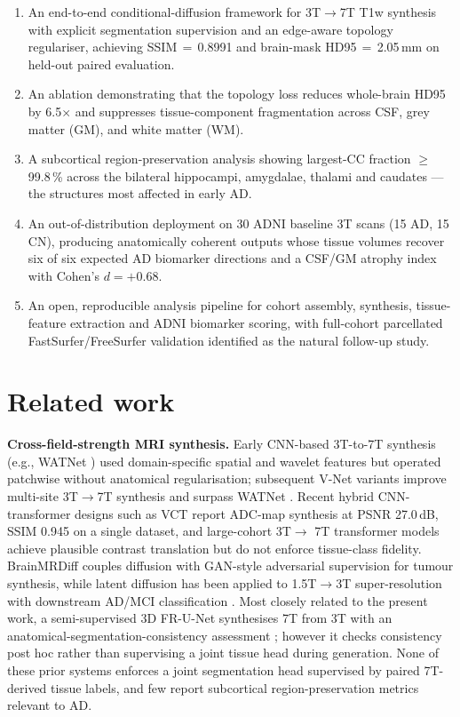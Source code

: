 \documentclass[10pt,twocolumn,a4paper]{article}
\begin{document}
\begin{enumerate}\itemsep1pt
\item An end-to-end conditional-diffusion framework for 3T$\rightarrow$7T
T1w synthesis with explicit segmentation supervision and an edge-aware
topology regulariser, achieving SSIM\,$=$\,0.8991 and brain-mask
HD95\,$=$\,2.05\,mm on held-out paired evaluation.
\item An ablation demonstrating that the topology loss reduces
whole-brain HD95 by 6.5$\times$ and suppresses tissue-component
fragmentation across CSF, grey matter (GM), and white matter (WM).
\item A subcortical region-preservation analysis showing largest-CC
fraction $\geq$\,99.8\,\% across the bilateral hippocampi, amygdalae,
thalami and caudates --- the structures most affected in early AD.
\item An out-of-distribution deployment on 30 ADNI baseline 3T scans
(15 AD, 15 CN), producing anatomically coherent outputs whose tissue
volumes recover six of six expected AD biomarker directions and a
CSF/GM atrophy index with Cohen's $d=+0.68$.
\item An open, reproducible analysis pipeline for cohort assembly,
synthesis, tissue-feature extraction and ADNI biomarker scoring, with
full-cohort parcellated FastSurfer/FreeSurfer validation identified as
the natural follow-up study.
\end{enumerate}

\section{Related work}
\label{sec:related}

\textbf{Cross-field-strength MRI synthesis.} Early CNN-based 3T-to-7T
synthesis (e.g., WATNet \cite{qu2020synthesized}) used domain-specific
spatial and wavelet features but operated patchwise without
anatomical regularisation; subsequent V-Net variants improve multi-site
3T$\rightarrow$7T synthesis and surpass WATNet \cite{cui2024synth7t}.
Recent hybrid CNN-transformer designs such as
VCT \cite{eidex2024highresolution} report ADC-map synthesis at PSNR
27.0\,dB, SSIM 0.945 on a single dataset, and large-cohort 3T$\rightarrow$
7T transformer models \cite{gicquel2025converting} achieve plausible
contrast translation but do not enforce tissue-class fidelity.
BrainMRDiff \cite{bhattacharya2025brainmrdiff} couples diffusion with
GAN-style adversarial supervision for tumour synthesis, while latent
diffusion has been applied to 1.5T$\rightarrow$3T super-resolution with
downstream AD/MCI classification \cite{yoon2024latent}. Most closely
related to the present work, a semi-supervised 3D FR-U-Net synthesises
7T from 3T with an anatomical-segmentation-consistency assessment
\cite{acs2025semisupervised}; however it checks consistency post hoc
rather than supervising a joint tissue head during generation. None of
these prior systems enforces a joint segmentation head supervised by
paired 7T-derived tissue labels, and few report subcortical
region-preservation metrics relevant to AD.
\end{document}

